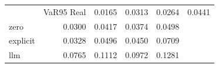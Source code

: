 \begin{tabular}{lrrrr}
\toprule
 & VaR95%
\midrule
Real & 0.0165 & 0.0313 & 0.0264 & 0.0441 \\
zero & 0.0300 & 0.0417 & 0.0374 & 0.0498 \\
explicit & 0.0328 & 0.0496 & 0.0450 & 0.0709 \\
llm & 0.0765 & 0.1112 & 0.0972 & 0.1281 \\
\bottomrule
\end{tabular}
